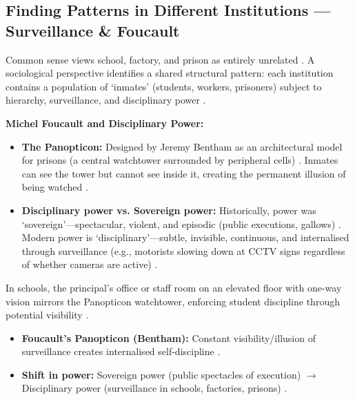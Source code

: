 \subsection{Finding Patterns in Different Institutions --- Surveillance \& Foucault}

\begin{ComparisonBox}
Common sense views school, factory, and prison as entirely unrelated . A sociological perspective identifies a shared structural pattern: each institution contains a population of `inmates' (students, workers, prisoners) subject to hierarchy, surveillance, and disciplinary power .
\end{ComparisonBox}

\begin{KeyConcept}
\textbf{Michel Foucault and Disciplinary Power:}
\begin{itemize}
    \item \textbf{The Panopticon:} Designed by Jeremy Bentham as an architectural model for prisons (a central watchtower surrounded by peripheral cells) . Inmates can see the tower but cannot see inside it, creating the permanent illusion of being watched .
    \item \textbf{Disciplinary power vs. Sovereign power:} Historically, power was `sovereign'---spectacular, violent, and episodic (public executions, gallows) . Modern power is `disciplinary'---subtle, invisible, continuous, and internalised through surveillance (e.g., motorists slowing down at CCTV signs regardless of whether cameras are active) .
\end{itemize}
\end{KeyConcept}

\begin{ExampleBox}
In schools, the principal's office or staff room on an elevated floor with one-way vision mirrors the Panopticon watchtower, enforcing student discipline through potential visibility .
\end{ExampleBox}

\begin{QuickRevision}
\begin{itemize}
    \item \textbf{Foucault's Panopticon (Bentham):} Constant visibility/illusion of surveillance creates internalised self-discipline .
    \item \textbf{Shift in power:} Sovereign power (public spectacles of execution) $\rightarrow$ Disciplinary power (surveillance in schools, factories, prisons) .
\end{itemize}
\end{QuickRevision}

